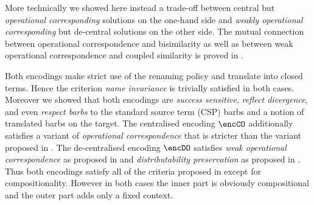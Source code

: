 \documentclass[]{eptcs}
\begin{document}
More technically we showed here instead a trade-off between central but \emph{operational corresponding} solutions on the one-hand side and \emph{weakly operational corresponding} but de-central solutions on the other side.
The mutual connection between operational correspondence and bisimilarity as well as between weak operational correspondence and coupled similarity is proved in \cite{petersGlabbeek15}.

Both encodings make strict use of the renaming policy and translate into closed terms.
Hence the criterion \emph{name invariance} is trivially satisfied in both cases.
Moreover we showed that both encodings are \emph{success sensitive}, \emph{reflect divergence}, and even \emph{respect barbs} \wrt to the standard source term (CSP) barbs and a notion of translated barbs on the target.
The centralised encoding $ \encCO $ additionally satisfies a variant of \emph{operational correspondence} that is stricter than the variant proposed in \cite{gorla10}.
The de-centralised encoding $ \encDO $ satisfies \emph{weak operational correspondence} as proposed in \cite{gorla10} and \emph{distributability preservation} as proposed in \cite{petersNestmannGoltz13}.
Thus both encodings satisfy all of the criteria proposed in \cite{gorla10} except for compositionality.
However in both cases the inner part is obviously compositional and the outer part adds only a fixed context.
\end{document}
